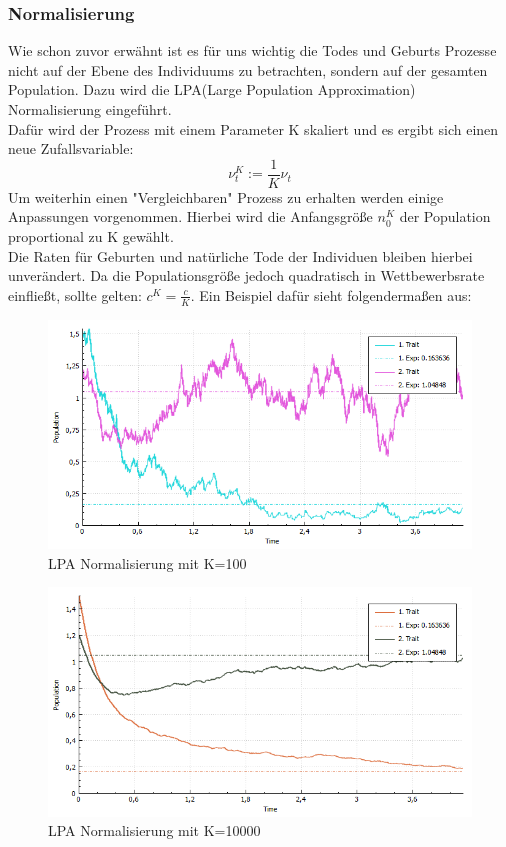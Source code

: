 \documentclass{article}
\begin{document}
		\subsubsection{Normalisierung}
		Wie schon zuvor erwähnt ist es für uns wichtig die Todes und Geburts Prozesse nicht auf der Ebene des Individuums zu betrachten, sondern auf der gesamten Population. Dazu wird die LPA(Large Population Approximation) Normalisierung eingeführt.\\
		Dafür wird der Prozess mit einem Parameter K skaliert und es ergibt sich einen neue Zufallsvariable:
		\[ \nu_t^K := \frac{1}{K} \nu_t \]
		Um weiterhin einen "{}Vergleichbaren"{} Prozess zu erhalten werden einige Anpassungen vorgenommen.
		Hierbei wird die Anfangsgröße $ n_0^K $ der Population proportional zu K gewählt.\\
		Die Raten für Geburten und natürliche Tode der Individuen bleiben hierbei unverändert. Da die Populationsgröße jedoch quadratisch in Wettbewerbsrate einfließt, sollte gelten: $ c^K = \frac{c}{K} $. Ein Beispiel dafür sieht folgendermaßen aus:
		\begin{figure}[H]
			\centering
			\includegraphics[width=0.7\linewidth]{./LPANormalisierungK100}
			\caption[LPAK100]{LPA Normalisierung mit K=100}
			\label{LPA Normalisierung K=100}
		\end{figure}
		\begin{figure}[H]
			\centering
			\includegraphics[width=0.7\linewidth]{./LPANormalisierungK10000}
			\caption[LPAK100]{LPA Normalisierung mit K=10000}
			\label{LPA Normalisierung K=10000}
		\end{figure}
\end{document}
